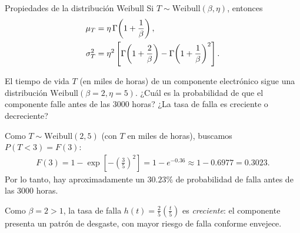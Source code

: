 {Propiedades de la distribución Weibull} Si $T \sim \text{Weibull}(\beta,\eta)$,
entonces
\begin{align}
 \mu_T &= \eta\,\Gamma\!\left(1 + \frac{1}{\beta}\right), \\
 \sigma_T^2 &= \eta^2\left[\Gamma\!\left(1 + \frac{2}{\beta}\right)
 - \Gamma\!\left(1 + \frac{1}{\beta}\right)^2\right].
\end{align}

\begin{ejemplo}
 \label{exmp:2.8.8}
El tiempo de vida $T$ (en miles de horas) de un componente electrónico sigue una
distribución $\text{Weibull}(\beta=2, \eta=5)$. ¿Cuál es la probabilidad de que el
componente falle antes de las $3000$ horas? ¿La tasa de falla es creciente o
decreciente?
\end{ejemplo}

\begin{solucion}
Como $T \sim \text{Weibull}(2,5)$ (con $T$ en miles de horas), buscamos $P(T < 3) =
F(3)$:
\begin{align}
 F(3) = 1 - \exp\!\left[-\left(\frac{3}{5}\right)^2\right]
 = 1 - e^{-0.36} \approx 1 - 0.6977 = 0.3023.
\end{align}
Por lo tanto, hay aproximadamente un $30.23\%$ de probabilidad de falla antes de las
$3000$ horas.

Como $\beta = 2 > 1$, la tasa de falla $h(t) = \frac{2}{5}\left(\frac{t}{5}\right)$ es
\emph{creciente}: el componente presenta un patrón de desgaste, con mayor riesgo de
falla conforme envejece.
\end{solucion}


